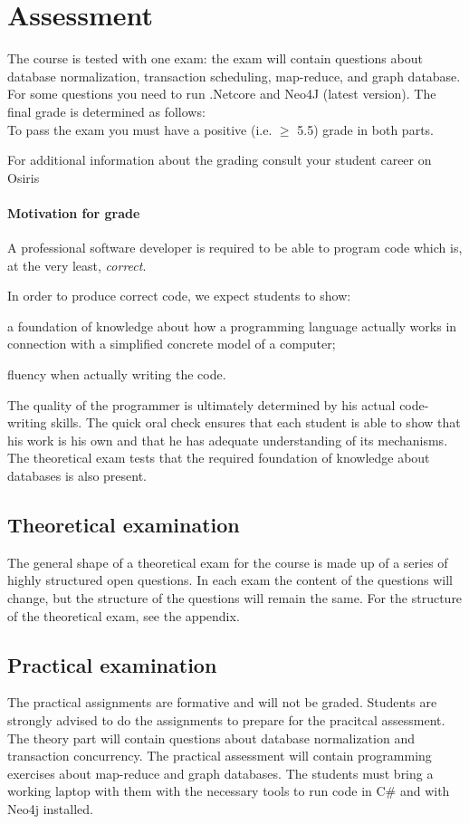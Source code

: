 \section{Assessment}
	The course is tested with one exam: the exam will contain questions about database normalization, transaction scheduling, map-reduce, and graph database.  For some questions you need to run .Netcore and Neo4J (latest version).
	The final grade is determined as follows: \\

	To pass the exam you must have a positive (i.e. $\geq$ 5.5) grade in both parts.
	
	For additional information about the grading consult your student career on Osiris

	\paragraph*{Motivation for grade}
		A professional software developer is required to be able to program code which is, at the very least, \textit{correct}.

		In order to produce correct code, we expect students to show:
		\begin{inparaenum}
			\item a foundation of knowledge about how a programming language actually works in connection with a simplified concrete model of a computer;
			\item fluency when actually writing the code.
		\end{inparaenum}

		The quality of the programmer is ultimately determined by his actual code-writing skills. The quick oral check ensures that each student is able to show that his work is his own and that he has adequate understanding of its mechanisms. The theoretical exam tests that the required foundation of knowledge about databases is also present.


	\subsection{Theoretical examination}
		The general shape of a theoretical exam for the course is made up of a series of highly structured open questions. In each exam the content of the questions will change, but the structure of the questions will remain the same. For the structure of the theoretical exam, see the appendix.


	\subsection{Practical examination}
		The practical assignments are formative and will not be graded. Students are strongly advised to do the assignments to prepare for the pracitcal assessment. The theory part will contain questions about database normalization and transaction concurrency. The practical assessment will contain programming exercises about map-reduce and graph databases. The students must bring a working laptop with them with the necessary tools to run code in C\# and with Neo4j installed.
